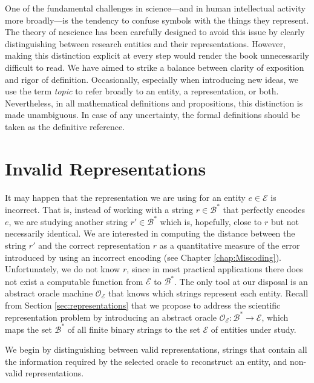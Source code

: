 \begin{remark}
One of the fundamental challenges in science—and in human intellectual activity more broadly—is the tendency to confuse symbols with the things they represent. The theory of nescience has been carefully designed to avoid this issue by clearly distinguishing between research entities and their representations. However, making this distinction explicit at every step would render the book unnecessarily difficult to read. We have aimed to strike a balance between clarity of exposition and rigor of definition. Occasionally, especially when introducing new ideas, we use the term \emph{topic} to refer broadly to an entity, a representation, or both. Nevertheless, in all mathematical definitions and propositions, this distinction is made unambiguous. In case of any uncertainty, the formal definitions should be taken as the definitive reference.
\end{remark}

%
%
\section{Invalid Representations}
\label{sec:invalid_representations}

It may happen that the representation we are using for an entity $e \in \mathcal{E}$ is incorrect. That is, instead of working with a string $r \in \mathcal{B}^\ast$ that perfectly encodes $e$, we are studying another string $r' \in \mathcal{B}^\ast$ which is, hopefully, close to $r$ but not necessarily identical. We are interested in computing the distance between the string $r'$ and the correct representation $r$ as a quantitative measure of the error introduced by using an incorrect encoding (see Chapter \ref{chap:Miscoding}). Unfortunately, we do not know $r$, since in most practical applications there does not exist a computable function from $\mathcal{E}$ to $\mathcal{B}^\ast$. The only tool at our disposal is an abstract oracle machine $\mathcal{O}_\mathcal{E}$ that knows which strings represent each entity. Recall from Section \ref{sec:representations} that we propose to address the scientific representation problem by introducing an abstract oracle $\mathcal{O}_\mathcal{E} : \mathcal{B}^\ast \rightarrow \mathcal{E}$, which maps the set $\mathcal{B}^\ast$ of all finite binary strings to the set $\mathcal{E}$ of entities under study.

We begin by distinguishing between valid representations, strings that contain all the information required by the selected oracle to reconstruct an entity, and non-valid representations.

